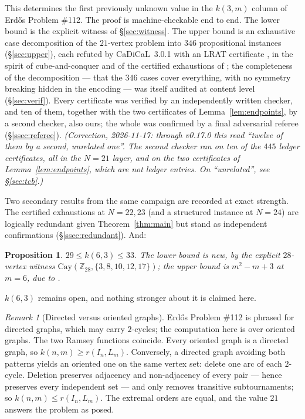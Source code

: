 \documentclass[11pt]{amsart}
\newcommand{\I}[1]{I_{#1}}
\theoremstyle{plain}
\newtheorem{proposition}[theorem]{Proposition}
\theoremstyle{definition}
\theoremstyle{remark}
\newtheorem{remark}[theorem]{Remark}
\begin{document}
This determines the first previously unknown value in the $k(3,m)$
column of Erd\H{o}s Problem \#112. The proof is machine-checkable end to
end. The lower bound is the explicit witness of \S\ref{sec:witness}. The
upper bound is an exhaustive case decomposition of the $21$-vertex
problem into $346$ propositional instances (\S\ref{sec:upper}), each
refuted by CaDiCaL~3.0.1 \cite{CaDiCaL} with
an LRAT certificate \cite{LRAT}, in the spirit of
cube-and-conquer \cite{HKWB11} and of the certified exhaustions of
\cite{HKM16}; the completeness of the decomposition --- that the $346$
cases cover everything, with no symmetry breaking hidden in the
encoding --- was itself audited at content level
(\S\ref{sec:verif}). Every certificate was verified by an independently
written checker, and ten of them, together with the two certificates of
Lemma~\ref{lem:endpoints}, by a second checker, also ours; the whole was
confirmed by a final adversarial referee (\S\ref{ssec:referee}).
\emph{(Correction, 2026-11-17: through v0.17.0 this read ``twelve of them
by a second, unrelated one''. The second checker ran on ten of the $445$
ledger certificates, all in the $N=21$ layer, and on the two certificates
of Lemma~\ref{lem:endpoints}, which are not ledger entries. On
``unrelated'', see \S\ref{sec:tcb}.)}

Two secondary results from the same campaign are recorded at exact
strength. The certified exhaustions at $N=22,23$ (and a structured
instance at $N=24$) are
logically redundant given Theorem~\ref{thm:main} but stand as
independent confirmations (\S\ref{ssec:redundant}). And:

\begin{proposition}\label{prop:k63}
$29\le k(6,3)\le 33$. The lower bound is new, by the explicit
$28$-vertex witness $\mathrm{Cay}(\mathbb{Z}_{28},\{3,8,10,12,17\})$;
the upper bound is $m^2-m+3$ at $m=6$, due to \cite{IRW21}.
\end{proposition}

\noindent $k(6,3)$ remains open, and nothing stronger about it is
claimed here.

\begin{remark}[Directed versus oriented graphs]\label{rem:bridge}
Erd\H{o}s Problem \#112 is phrased for directed graphs, which may carry
$2$-cycles; the computation here is over oriented graphs. The two Ramsey
functions coincide. Every oriented graph is a directed graph, so
$k(n,m)\ge r(\I{n},L_m)$. Conversely, a directed graph avoiding both
patterns yields an oriented one on the same vertex set: delete one arc
of each $2$-cycle. Deletion preserves adjacency and non-adjacency of
every pair --- hence preserves every independent set --- and only
removes transitive subtournaments; so $k(n,m)\le r(\I{n},L_m)$. The
extremal orders are equal, and the value $21$ answers the problem as
posed.
\end{remark}
\end{document}
